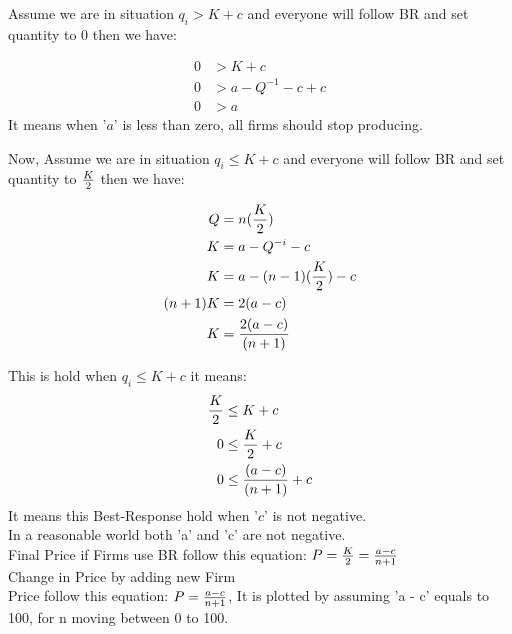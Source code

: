 \documentclass[
  course = {{IE579 Game Theory and Multi-Agent Reinforcement Learning}},
  quartile = {{4}},
  assignment = 2,
  name = {{Mohammad Mahdi Rahimi}},
  studentnumber = {{20208244}},
  email = {{mahi@kaist.ac.kr}},
  firstexercise = 1
]{aga-homework}
\begin{document}
Assume we are in situation $q_i > K + c$ and everyone will follow BR and set quantity to 0 then we have:

\begin{equation} \label{eq1}
\begin{split}
0 & > K + c \\
0 & > a - Q^{-1} - c + c\\
0 & > a
\end{split}
\end{equation}
It means when '$a$' is less than zero, all firms should stop producing.

Now, Assume we are in situation $q_i \le K + c$ and everyone will follow BR and set quantity to $K \over 2$ then we have:

\begin{equation} \label{eq1}
\begin{split}
Q & = n({K \over 2}) \\
K & = a - Q^{-i} - c\\
K & = a - (n - 1)({K \over 2}) - c\\
(n+1)K & = 2(a - c)\\
K & = {2(a - c) \over (n + 1)}\\
\end{split}
\end{equation}

This is hold when $q_i \le K + c$ it means:
\begin{equation} \label{eq1}
\begin{split}
{K \over 2} & \le K + c\\
0 & \le {K \over 2} + c\\
0 & \le {(a - c) \over (n + 1)} + c
\end{split}
\end{equation}
It means this Best-Response hold when '$c$' is not negative.\\
In a reasonable world both 'a' and 'c' are not negative.\\
Final Price if Firms use BR follow this equation: $P = {K \over 2} = {a - c \over n + 1}$\\

\subexercise Change in Price by adding new Firm\\

Price follow this equation: $P = {a - c \over n + 1}$, It is plotted by assuming 'a - c' equals to 100, for n moving between 0 to 100.

\begin{center}
\end{center}
\end{document}

